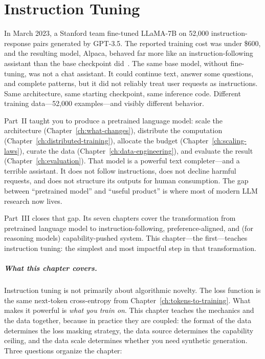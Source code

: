 \chapter{Instruction Tuning}
\label{ch:instruction-tuning}
\raggedbottom

In March 2023, a Stanford team fine-tuned LLaMA-7B on 52{,}000 instruction-response pairs generated by GPT-3.5. The reported training cost was under \$600, and the resulting model, Alpaca, behaved far more like an instruction-following assistant than the base checkpoint did~\cite{taori2023alpaca}. The same base model, without fine-tuning, was not a chat assistant. It could continue text, answer some questions, and complete patterns, but it did not reliably treat user requests as instructions. Same architecture, same starting checkpoint, same inference code. Different training data---52{,}000 examples---and visibly different behavior.

Part~II taught you to produce a pretrained language model: scale the architecture (Chapter~\ref{ch:what-changes}), distribute the computation (Chapter~\ref{ch:distributed-training}), allocate the budget (Chapter~\ref{ch:scaling-laws}), curate the data (Chapter~\ref{ch:data-engineering}), and evaluate the result (Chapter~\ref{ch:evaluation}). That model is a powerful text completer---and a terrible assistant. It does not follow instructions, does not decline harmful requests, and does not structure its outputs for human consumption. The gap between ``pretrained model'' and ``useful product'' is where most of modern LLM research now lives.

Part~III closes that gap. Its seven chapters cover the transformation from pretrained language model to instruction-following, preference-aligned, and (for reasoning models) capability-pushed system. This chapter---the first---teaches instruction tuning: the simplest and most impactful step in that transformation.

\paragraph{What this chapter covers.} Instruction tuning is not primarily about algorithmic novelty. The loss function is the same next-token cross-entropy from Chapter~\ref{ch:tokens-to-training}. What makes it powerful is \emph{what you train on}. This chapter teaches the mechanics and the data together, because in practice they are coupled: the format of the data determines the loss masking strategy, the data source determines the capability ceiling, and the data scale determines whether you need synthetic generation. Three questions organize the chapter:

